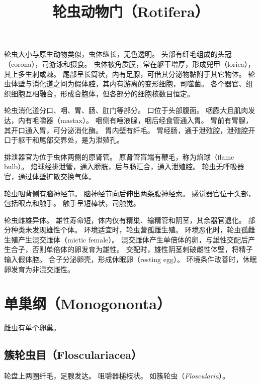 \documentclass[11pt]{article}
\title{轮虫动物门（Rotifera）}
\date{}
\begin{document}
  \maketitle

  \linenumbers
轮虫大小与原生动物类似，虫体纵长，无色透明。
头部有纤毛组成的头冠（corona），司游泳和摄食。
虫体被角质膜，常在躯干增厚，形成兜甲（lorica），其上多生刺或棘。
尾部呈长筒状，内有足腺，可借其分泌物黏附于其它物体。
轮虫体壁与消化道之间为假体腔，其内有游离的变形细胞，司噬菌。
各个器官、组织细胞互相融合，形成合胞体，但各部分的细胞核数目恒定。

\newline

轮虫消化道分口、咽、胃、肠、肛门等部分。
口位于头部腹面。
咽膨大且肌肉发达，内有咀嚼器（mastax）。
咽侧有唾液腺，咽后经食管通入胃。
胃前有胃腺，其开口通入胃，可分泌消化酶。
胃内壁有纤毛。
胃经肠，通于泄殖腔，泄殖腔开口于躯干和尾部交界处，是为泄殖孔。

\newline

排泄器官为位于虫体两侧的原肾管。
原肾管盲端有鞭毛，称为焰球（flame bulb）。
焰球经排泄管，通入膀胱，后与肠汇合，通入泄殖腔。
轮虫无呼吸器官，通过体壁扩散交换气体。

\newline

轮虫咽背侧有脑神经节。
脑神经节向后伸出两条腹神经索。
感觉器官位于头部，包括眼点和触手。
触手呈短棒状，司触觉。

\newline

轮虫雌雄异体。
雄性寿命短，体内仅有精巢、输精管和阴茎，其余器官退化。
部分种类未发现雄性个体。
环境适宜时，轮虫营孤雌生殖。
环境恶化时，轮虫孤雌生殖产生混交雌体（mictic female）。
混交雌体产生单倍体的卵，与雄性交配后产生合子，否则单倍体的卵发育为雄性。
交配时，雄性阴茎刺破雌性体壁，将精子输入假体腔。
合子分泌卵壳，形成休眠卵（resting egg）。
环境条件改善时，休眠卵发育为非混交雌性。

\section{单巢纲（Monogononta）}
雌虫有单个卵巢。

\subsection{簇轮虫目（Flosculariacea）}
轮盘上两圈纤毛，足腺发达。
咀嚼器槌枝状。
如簇轮虫（\textit{Floscularia}）。
\end{document}
